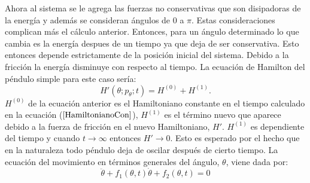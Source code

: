 \documentclass[aps,twocolumn,secnumarabic,nobalancelastpage,amsmath,amssymb,nofootinbib]{revtex4-1}
\begin{document}
		\indent Ahora al sistema se le agrega las fuerzas no conservativas que son disipadoras de la energ\'ia y adem\'as se consideran \'angulos de 0 a $\pi$. Estas consideraciones complican m\'as el c\'alculo anterior. Entonces, para un \'angulo determinado lo que cambia es la energ\'ia despues de un tiempo ya que deja de ser conservativa. Esto entonces depende estrictamente de la posici\'on inicial del sistema\cite{galley2013classical}. Debido a la fricci\'on la energ\'ia disminuye con respecto al tiempo. La ecuaci\'on de Hamilton del p\'endulo simple para este caso ser\'ia:   
		\begin{equation}
			H'(\theta; p_\theta; t) = H^{(0)} + H^{(1)}.
			\label{EcuacionHamilton} 
		\end{equation}
		$H^{(0)}$ de la ecuaci\'on anterior es el Hamiltoniano constante en el tiempo calculado en la ecuaci\'on ($\ref{HamiltonianoCon}$), $H^{(1)}$ es el t\'ermino nuevo que aparece debido a la fuerza de fricci\'on en el nuevo Hamiltoniano, $H'$. $H^{(1)}$ es dependiente del tiempo y cuando $t\rightarrow\infty$ entonces $H'\rightarrow0$. Esto es esperado por el hecho que en la naturaleza todo p\'endulo deja de oscilar despu\'es de cierto tiempo. La ecuaci\'on del movimiento en t\'erminos generales del \'angulo, $\theta$, viene dada por:
		\begin{equation}
			\ddot{\theta} + f_1(\theta, t)\dot{\theta} + f_2(\theta, t) = 0
			\label{ecuacionMovimiento}
		\end{equation}
		
\end{document}
